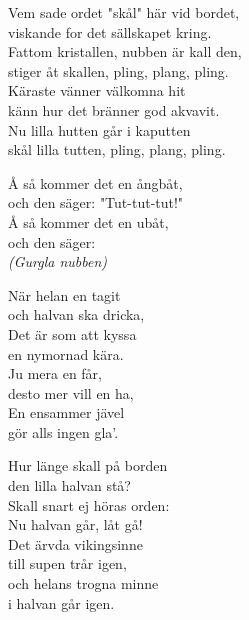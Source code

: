 \documentclass[a6paper, 10pt, twoside]{article}
\begin{document}
\newpage
\noindent
\begin{center}
\end{center}
\begin{lyrics}
Vem sade ordet "skål" här vid bordet,\\
viskande for det sällskapet kring.\\
Fattom kristallen, nubben är kall den,\\
stiger åt skallen, pling, plang, pling.\\
Käraste vänner välkomna hit\\
känn hur det bränner god akvavit.\\
Nu lilla hutten går i kaputten\\
skål lilla tutten, pling, plang, pling.
\end{lyrics}
\vspace{60pt}
\begin{center}
\end{center}
\begin{lyrics}
Å så kommer det en ångbåt, \\
och den säger: "Tut-tut-tut!" \\
Å så kommer det en ubåt, \\
och den säger: \\
\textit{(Gurgla nubben) }
\end{lyrics}

\noindent
\begin{center}
\end{center}
\begin{lyrics}
När helan en tagit \\
och halvan ska dricka, \\
Det är som att kyssa \\
en nymornad kära. 
\vspace{5pt} \\
Ju mera en får, \\
desto mer vill en ha, \\
En ensammer jävel \\
gör alls ingen gla'. 
\end{lyrics}
\vspace{60pt}
\begin{center}
\end{center}
\begin{lyrics}
Hur länge skall på borden\\ 
den lilla halvan stå? \\
Skall snart ej höras orden: \\
Nu halvan går, låt gå!
\vspace{5pt} \\
Det ärvda vikingsinne \\
till supen trår igen, \\
och helans trogna minne \\
i halvan går igen.
\end{lyrics}
\end{document}
